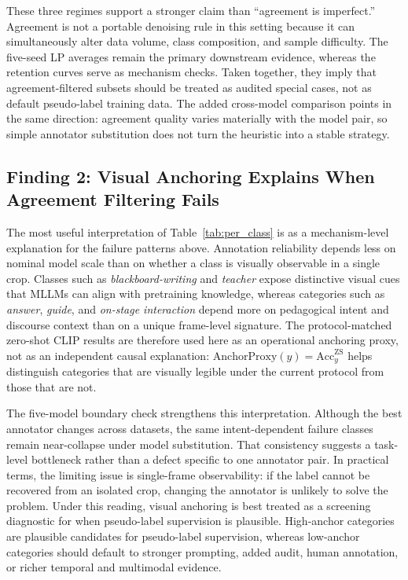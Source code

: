 \documentclass[10pt,letterpaper]{article}
\begin{document}
These three regimes support a stronger claim than ``agreement is
imperfect.''
Agreement is not a portable denoising rule in this setting because it
can simultaneously alter data volume, class composition, and sample
difficulty.
The five-seed LP averages remain the primary downstream evidence,
whereas the retention curves serve as mechanism checks.
Taken together, they imply that agreement-filtered subsets should be
treated as audited special cases, not as default pseudo-label training
data.
The added cross-model comparison points in the same direction:
agreement quality varies materially with the model pair, so simple
annotator substitution does not turn the heuristic into a stable
strategy.

\subsection*{Finding 2: Visual Anchoring Explains When Agreement
Filtering Fails}

The most useful interpretation of Table~\ref{tab:per_class} is as a
mechanism-level explanation for the failure patterns above.
Annotation reliability depends less on nominal model scale than on
whether a class is visually observable in a single crop.
Classes such as \textit{blackboard-writing} and \textit{teacher}
expose distinctive visual cues that MLLMs can align with pretraining
knowledge, whereas categories such as \textit{answer}, \textit{guide},
and \textit{on-stage interaction} depend more on pedagogical intent and
discourse context than on a unique frame-level signature.
The protocol-matched zero-shot CLIP results are therefore used here as
an operational anchoring proxy, not as an independent causal
explanation: $\mathrm{AnchorProxy}(y)=\mathrm{Acc}^{\mathrm{ZS}}_{y}$
helps distinguish categories that are visually legible under the
current protocol from those that are not.

The five-model boundary check strengthens this interpretation.
Although the best annotator changes across datasets, the same
intent-dependent failure classes remain near-collapse under model
substitution.
That consistency suggests a task-level bottleneck rather than a defect
specific to one annotator pair.
In practical terms, the limiting issue is single-frame observability:
if the label cannot be recovered from an isolated crop, changing the
annotator is unlikely to solve the problem.
Under this reading, visual anchoring is best treated as a screening
diagnostic for when pseudo-label supervision is plausible.
High-anchor categories are plausible candidates for pseudo-label
supervision, whereas low-anchor categories should default to stronger
prompting, added audit, human annotation, or richer temporal and
multimodal evidence.
\end{document}
